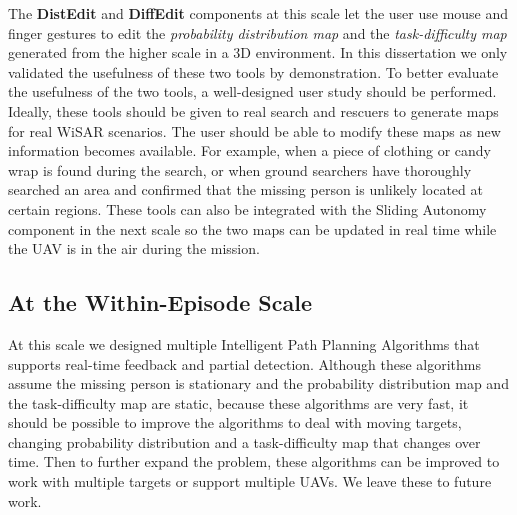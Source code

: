The \textbf{DistEdit} and \textbf{DiffEdit} components at this scale let the user use mouse and finger gestures to edit the \textit{probability distribution map} and the \textit{task-difficulty map} generated from the higher scale in a 3D environment. In this dissertation we only validated the usefulness of these two tools by demonstration. To better evaluate the usefulness of the two tools, a well-designed user study should be performed. Ideally, these tools should be given to real search and rescuers to generate maps for real WiSAR scenarios. The user should be able to modify these maps as new information becomes available. For example, when a piece of clothing or candy wrap is found during the search, or when ground searchers have thoroughly searched an area and confirmed that the missing person is unlikely located at certain regions. These tools can also be integrated with the Sliding Autonomy component in the next scale so the two maps can be updated in real time while the UAV is in the air during the mission.

\subsection{At the Within-Episode Scale}

At this scale we designed multiple Intelligent Path Planning Algorithms that supports real-time feedback and partial detection. Although these algorithms assume the missing person is stationary and the probability distribution map and the task-difficulty map are static, because these algorithms are very fast, it should be possible to improve the algorithms to deal with moving targets, changing probability distribution and a task-difficulty map that changes over time. Then to further expand the problem, these algorithms can be improved to work with multiple targets or support multiple UAVs. We leave these to future work.

